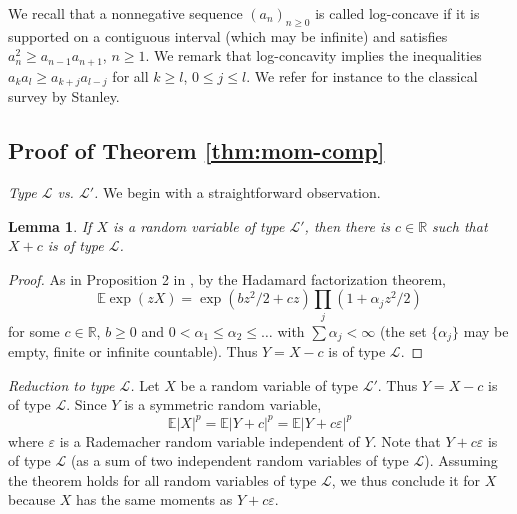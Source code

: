 \documentclass[10pt]{article}
\newcommand{\E}{\mathbb{E}}
\newcommand{\1}{\textbf{1}}
\newcommand{\R}{\mathbb{R}}
\newcommand{\e}{\varepsilon}
\newcommand{\sL}{\mathscr{L}}
\newtheorem{lemma}[theorem]{Lemma}
\theoremstyle{remark}
\theoremstyle{definition}
\begin{document}
We recall that a nonnegative sequence $(a_n)_{n \geq 0}$ is called log-concave if it is supported on a contiguous interval (which may be infinite) and satisfies $a_n^2 \geq a_{n-1}a_{n+1}$, $n \geq 1$. We remark that log-concavity implies the inequalities $a_ka_l \geq a_{k+j}a_{l-j}$ for all $k \geq l$, $0 \leq j \leq l$. We refer for instance to the classical survey \cite{stan} by Stanley.



\subsection{Proof of Theorem \ref{thm:mom-comp}}


\emph{Type $\mathscr{L}$ vs. $\mathscr{L}'$.} We begin with a straightforward observation.

\begin{lemma}\label{lm:LvsL'}
If $X$ is a random variable of type $\sL'$, then there is $c \in \R$ such that $X+c$ is of type $\sL$.
\end{lemma}
\begin{proof}
As in Proposition 2 in \cite{N1}, by the Hadamard factorization theorem,
\begin{equation}\label{eq:rep}
\E\exp(zX) = \exp(bz^2/2+cz)\prod_j (1+\alpha_jz^2/2)
\end{equation}
for some $c \in \R$, $b \geq 0$ and $0< \alpha_1 \leq \alpha_2 \leq \ldots$ with $\sum \alpha_j < \infty$ (the set $\{\alpha_j\}$ may be empty, finite or infinite countable). Thus $Y = X-c$ is of type $\mathscr{L}$.
\end{proof}

\emph{Reduction to type $\mathscr{L}$.}
Let $X$ be a random variable of type $\mathscr{L}'$. Thus $Y = X-c$ is of type $\mathscr{L}$. Since $Y$ is a symmetric random variable,
\begin{equation}\label{eq:mom-same}
\E|X|^p = \E|Y+c|^p = \E|Y+c\varepsilon|^p
\end{equation}
where $\e$ is a Rademacher random variable independent of $Y$. Note that $Y + c\e$ is of type $\mathscr{L}$ (as a sum of two independent random variables of type $\mathscr{L}$). Assuming the theorem holds for all random variables of type $\mathscr{L}$, we thus conclude it for $X$ because $X$ has the same moments as $Y + c\e$.
\end{document}

